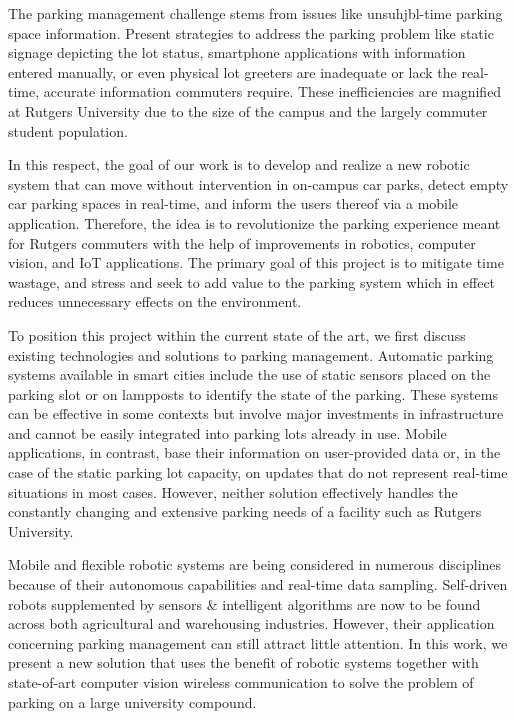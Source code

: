 \documentclass{article}
\begin{document}
\begin{enumerate}[leftmargin=1.5cm]
    The parking management challenge stems from issues like unsuhjbl-time parking space information.
    Present strategies to address the parking problem like static signage depicting the lot status,
    smartphone applications with information entered manually,
    or even physical lot greeters are inadequate or lack the real-time,
    accurate information commuters require.
    These inefficiencies are magnified at Rutgers University due to the size of the campus and the largely commuter student population.

    In this respect, 
    the goal of our work is to develop and realize a new robotic system that can move without intervention in on-campus car parks, 
    detect empty car parking spaces in real-time, 
    and inform the users thereof via a mobile application. 
    Therefore, 
    the idea is to revolutionize the parking experience meant for Rutgers commuters with the help of improvements in robotics, 
    computer vision, 
    and IoT applications. 
    The primary goal of this project is to mitigate time wastage, 
    and stress and seek to add value to the parking system which in effect reduces unnecessary effects on the environment.

    To position this project within the current state of the art, 
    we first discuss existing technologies and solutions to parking management. 
    Automatic parking systems available in smart cities include the use of static sensors placed on the parking slot or on lampposts to identify the state of the parking. 
    These systems can be effective in some contexts but involve major investments in infrastructure and cannot be easily integrated into parking lots already in use. 
    Mobile applications, 
    in contrast, 
    base their information on user-provided data or, 
    in the case of the static parking lot capacity, 
    on updates that do not represent real-time situations in most cases. 
    However, 
    neither solution effectively handles the constantly changing and extensive parking needs of a facility such as Rutgers University.

    Mobile and flexible robotic systems are being considered in numerous disciplines because of their autonomous capabilities and real-time data sampling. 
    Self-driven robots supplemented by sensors \& intelligent algorithms are now to be found across both agricultural and warehousing industries. 
    However, 
    their application concerning parking management can still attract little attention. 
    In this work, 
    we present a new solution that uses the benefit of robotic systems together with state-of-art 
    computer vision wireless communication to solve the problem of parking on a large university compound.


\end{enumerate}
\end{document}
